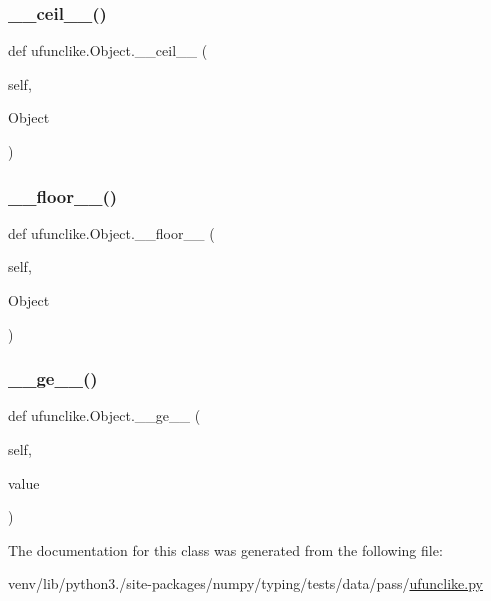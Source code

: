 \mbox{\label{classufunclike_1_1Object_a02709e272bb19535fe9a7f57a5972b3e}} 
\subsubsection{\texorpdfstring{\+\_\+\+\_\+ceil\+\_\+\+\_\+()}{\_\_ceil\_\_()}}
{\footnotesize\ttfamily def ufunclike.\+Object.\+\_\+\+\_\+ceil\+\_\+\+\_\+ (\begin{DoxyParamCaption}\item[{}]{self,  }\item[{}]{Object }\end{DoxyParamCaption})}

\mbox{\label{classufunclike_1_1Object_a9e2d23cc5c5de1c33a9905a02acffb7d}} 
\subsubsection{\texorpdfstring{\+\_\+\+\_\+floor\+\_\+\+\_\+()}{\_\_floor\_\_()}}
{\footnotesize\ttfamily def ufunclike.\+Object.\+\_\+\+\_\+floor\+\_\+\+\_\+ (\begin{DoxyParamCaption}\item[{}]{self,  }\item[{}]{Object }\end{DoxyParamCaption})}

\mbox{\label{classufunclike_1_1Object_af7d5484b114cf8efecd7759026fd84fa}} 
\subsubsection{\texorpdfstring{\+\_\+\+\_\+ge\+\_\+\+\_\+()}{\_\_ge\_\_()}}
{\footnotesize\ttfamily def ufunclike.\+Object.\+\_\+\+\_\+ge\+\_\+\+\_\+ (\begin{DoxyParamCaption}\item[{}]{self,  }\item[{}]{value }\end{DoxyParamCaption})}



The documentation for this class was generated from the following file\+:\begin{DoxyCompactItemize}
\item 
venv/lib/python3./site-\/packages/numpy/typing/tests/data/pass/\hyperlink{typing_2tests_2data_2pass_2ufunclike_8py}{ufunclike.\+py}\end{DoxyCompactItemize}
